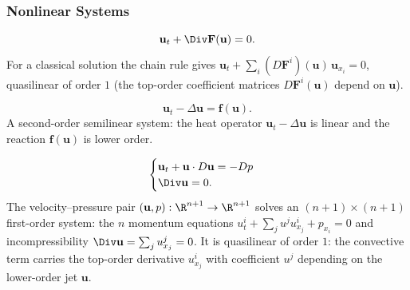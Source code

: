 \subsubsection{Nonlinear Systems}
\label{sec:examples-nonlinear-systems}

\begin{example}
\label{ex:system-conservation-laws}
\leanok
$$\mathbf{u}_t + \Div \mathbf{F}(\mathbf{u}) = 0.$$
For a classical solution the chain rule gives $\mathbf{u}_t + \sum_i (D\mathbf{F}^i)(\mathbf{u})\,\mathbf{u}_{x_i} = 0$, quasilinear of order $1$ (the top-order coefficient matrices $D\mathbf{F}^i(\mathbf{u})$ depend on $\mathbf{u}$).
\end{example}

\begin{example}
\label{ex:reaction-diffusion-system}
\leanok
$$\mathbf{u}_t - \Delta\mathbf{u} = \mathbf{f}(\mathbf{u}).$$
A second-order semilinear system: the heat operator $\mathbf{u}_t - \Delta\mathbf{u}$ is linear and the reaction $\mathbf{f}(\mathbf{u})$ is lower order.
\end{example}

\begin{example}
\label{ex:euler-equations-incompressible-inviscid}
\leanok
$$\begin{cases}
\mathbf{u}_t + \mathbf{u} \cdot D\mathbf{u} = -D p \\
\Div \mathbf{u} = 0.
\end{cases}$$
The velocity--pressure pair $(\mathbf{u}, p) : \R^{n+1} \to \R^{n+1}$ solves an $(n+1) \times (n+1)$ first-order system: the $n$ momentum equations $u^i_t + \sum_j u^j u^i_{x_j} + p_{x_i} = 0$ and incompressibility $\Div \mathbf{u} = \sum_j u^j_{x_j} = 0$. It is quasilinear of order $1$: the convective term carries the top-order derivative $u^i_{x_j}$ with coefficient $u^j$ depending on the lower-order jet $\mathbf{u}$.
\end{example}

